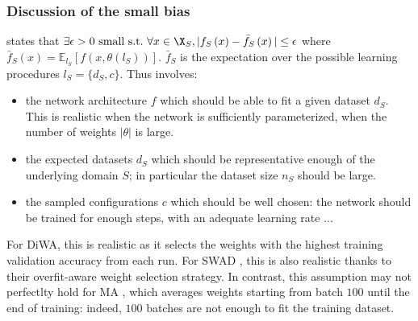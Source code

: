 \subsubsection{Discussion of the small \iid bias }
\label{app:bias_correlation_ass_noiidbias}
 states that $\exists \epsilon > 0 \text{~small~s.t.~} \forall x\in \X_S, |f_{S}\left(x\right)-\bar{f}_{S}\left(x\right)|\leq \epsilon$ where $\bar{f}_{S}\left(x\right) = \mathbb{E}_{l_S} \left[f\left(x,\theta\left(l_S\right)\right)\right]$.
$\bar{f}_{S}$ is the expectation over the possible learning procedures $l_S=\{d_S, c\}$. Thus  involves:
\begin{itemize}
    \item the network architecture $f$ which should be able to fit a given dataset $d_S$. This is realistic when the network is sufficiently parameterized, \ie when the number of weights $|\theta|$ is large.
    \item the expected datasets $d_S$ which should be representative enough of the underlying domain $S$; in particular the dataset size $n_S$ should be large.
    \item the sampled configurations $c$ which should be well chosen: the network should be trained for enough steps, with an adequate learning rate ...
\end{itemize}
For DiWA, this is realistic as it selects the weights with the highest training validation accuracy from each run. For SWAD \cite{cha2021wad}, this is also realistic thanks to their overfit-aware weight selection strategy. In contrast, this assumption may not perfectlty hold for MA \cite{arpit2021ensemble}, which averages weights starting from batch $100$ until the end of training: indeed, $100$ batches are not enough to fit the training dataset.%
